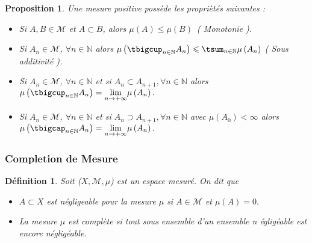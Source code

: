 \documentclass[3pt]{article}
\newtheorem{definition}[theorem]{D\'{e}finition}
\newtheorem{proposition}[theorem]{Proposition}
\begin{document}
\bigskip 

\begin{proposition}
Une mesure positive poss\`{e}de les propri\`{e}t\'{e}s suivantes :

\begin{itemize}
\item Si $A,B\in \mathcal{M}$ et $A\subset B$, alors $\mu (A)\leqslant \mu
\left( B\right) $\ ( Monotonie ).

\item Si $A_{n}\in \mathcal{M}$, $\forall n\in \mathbb{N}$ alors $\mu \left(
\tbigcup_{n\in \mathbb{N}}A_{n}\right) \leqslant \tsum_{n\in \mathbb{N}}\mu
\left( A_{n}\right) $ ( Sous additivit\'{e} ).

\item Si $A_{n}\in \mathcal{M}$, $\forall n\in \mathbb{N}$ et si $%
A_{n}\subset A_{n+1},\forall n\in \mathbb{N}$ alors $\mu \left(
\tbigcup_{n\in \mathbb{N}}A_{n}\right) =\underset{n\rightarrow +\infty }{%
\lim }\mu \left( A_{n}\right) .$

\item Si $A_{n}\in \mathcal{M}$, $\forall n\in \mathbb{N}$ et si $%
A_{n}\supset A_{n+1},\forall n\in \mathbb{N}$ avec $\mu \left( A_{0}\right)
<\infty $ alors $\mu \left( \tbigcap_{n\in \mathbb{N}}A_{n}\right) =\underset%
{n\rightarrow +\infty }{\lim }\mu \left( A_{n}\right) .$
\end{itemize}
\end{proposition}

\subsubsection{Completion de Mesure}

\bigskip 

\begin{definition}
Soit ($X,\mathcal{M},\mu $) est un espace mesur\'{e}. On dit que

\begin{itemize}
\item $A\subset X$ est n\'{e}gligeable pour la mesure $\mu $ si $A\in 
\mathcal{M}$ et $\mu (A)=0.$

\item La mesure $\mu $ est compl\`{e}te si tout sous ensemble d'un ensemble n%
\'{e}glig\'{e}able est encore n\'{e}glig\'{e}able.
\end{itemize}
\end{definition}

\bigskip 
\end{document}
